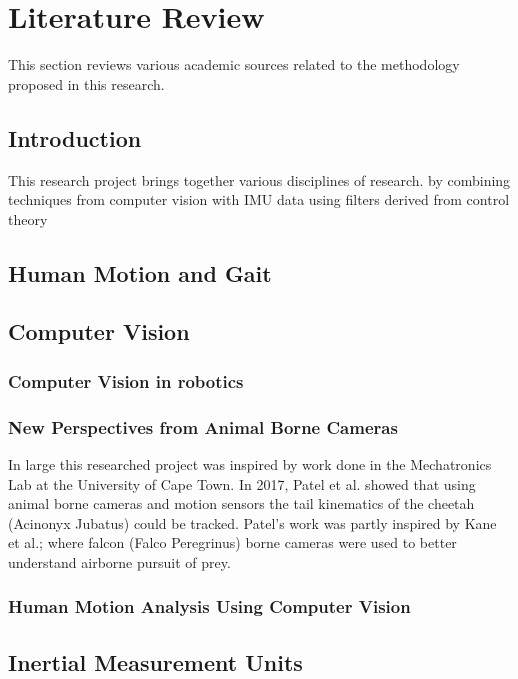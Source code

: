 \chapter{Literature Review}
This section reviews various academic sources related to the methodology proposed in this research.

\section{Introduction}
This research project brings together various disciplines of research. by combining techniques from computer vision with IMU data using filters derived from control theory 

\section{Human Motion and Gait}


\section{Computer Vision} 

\subsection{Computer Vision in robotics}

\subsection{New Perspectives from Animal Borne Cameras}
In large this researched project was inspired by work done in the Mechatronics Lab at the University of Cape Town. In 2017, Patel et al.  \cite{patel2017trackingieee} showed that using animal borne cameras and motion sensors the tail kinematics of the cheetah (Acinonyx Jubatus) could be tracked. Patel's work was partly inspired by Kane et al.;\cite{kane2014falcons} where falcon (Falco Peregrinus) borne cameras were used to better understand airborne pursuit of prey.

\subsection{Human Motion Analysis Using Computer Vision}


\section{Inertial Measurement Units}


